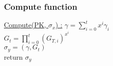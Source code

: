 \subsubsection{Compute function}
\underline{Compute(PK, $\sigma_x$) :} 
\tabNormal $\gamma = \sum_{i=0}^{t}x^i \gamma_i$ \\
\tabNormal $G_t = \prod_{i=0}^t (G_{T,i})^{x^i}$ \\
\tabNormal $\sigma_y = (\gamma, G_t)$ \\
\tabNormal return $\sigma_y$  \\